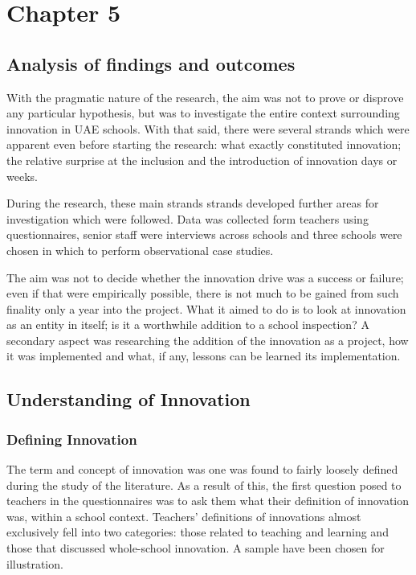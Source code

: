 \section{Chapter 5}
\subsection{Analysis of findings and outcomes}
With the pragmatic nature of the research, the aim was not to prove or disprove any particular hypothesis, but was to investigate the entire context surrounding innovation in UAE schools. With that said, there were several strands which were apparent even before starting the research: what exactly constituted innovation; the relative surprise at the inclusion and the introduction of innovation days or weeks.

During the research, these main strands strands developed further areas for investigation which were followed. Data was collected form teachers using questionnaires, senior staff were interviews across schools and three schools were chosen in which to perform observational case studies.

The aim was not to decide whether the innovation drive was a success or failure; even if that were empirically possible, there is not much to be gained from such finality only a year into the project. What it aimed to do is to look at innovation as an entity in itself; is it a worthwhile addition to a school inspection? A secondary aspect was researching the addition of the innovation as a project, how it was implemented and what, if any, lessons can be learned its implementation.

\subsection{Understanding of Innovation}
\subsubsection{Defining Innovation}
The term and concept of innovation was one was found to fairly loosely defined during the study of the literature. As a result of this, the first question posed to teachers in the questionnaires was to ask them what their definition of innovation was, within a school context. Teachers' definitions of innovations almost exclusively fell into two categories: those related to teaching and learning and those that discussed whole-school innovation. A sample have been chosen for illustration.

